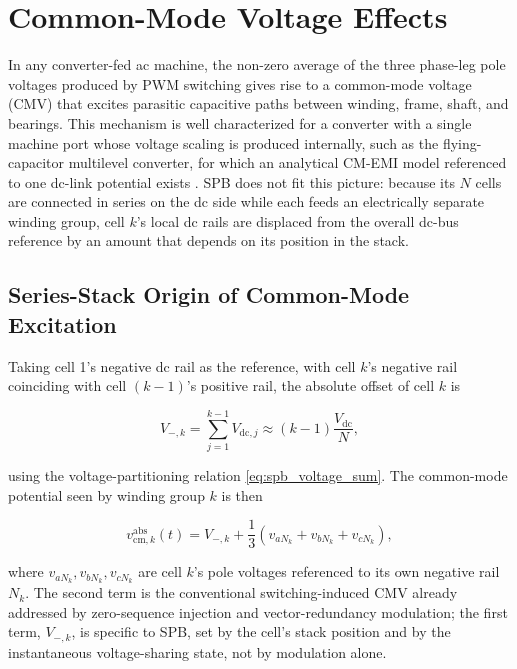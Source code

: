 \section{Common-Mode Voltage Effects}
\label{sec:common_mode}

In any converter-fed ac machine, the non-zero average of the three
phase-leg pole voltages produced by PWM switching gives rise to a
common-mode voltage (CMV) that excites parasitic capacitive paths
between winding, frame, shaft, and bearings. This mechanism is well
characterized for a converter with a single machine port whose voltage
scaling is produced internally, such as the flying-capacitor
multilevel converter, for which an analytical CM-EMI model referenced
to one dc-link potential exists \cite{Giardine2025FCMLEMI}. SPB does
not fit this picture: because its $N$ cells are connected in series on
the dc side while each feeds
an electrically separate winding group, cell $k$'s local dc rails are
displaced from the overall dc-bus reference by an amount that depends
on its position in the stack.

\subsection{Series-Stack Origin of Common-Mode Excitation}

Taking cell 1's negative dc rail as the reference, with cell $k$'s
negative rail coinciding with cell $(k-1)$'s positive rail, the
absolute offset of cell $k$ is

\begin{equation}
V_{-,k}=\sum_{j=1}^{k-1}V_{\mathrm{dc},j}
\approx(k-1)\frac{V_{\mathrm{dc}}}{N},
\label{eq:spb_cm_offset}
\end{equation}

using the voltage-partitioning relation \eqref{eq:spb_voltage_sum}. The
common-mode potential seen by winding group $k$ is then

\begin{equation}
v_{\mathrm{cm},k}^{\mathrm{abs}}(t)=
V_{-,k}+\frac{1}{3}\left(v_{aN_k}+v_{bN_k}+v_{cN_k}\right),
\label{eq:spb_cm_local}
\end{equation}

where $v_{aN_k},v_{bN_k},v_{cN_k}$ are cell $k$'s pole voltages
referenced to its own negative rail $N_k$. The second term is the
conventional switching-induced CMV already addressed by zero-sequence
injection and vector-redundancy modulation; the first term, $V_{-,k}$, is specific
to SPB, set by the cell's stack position and by the instantaneous
voltage-sharing state, not by
modulation alone.

